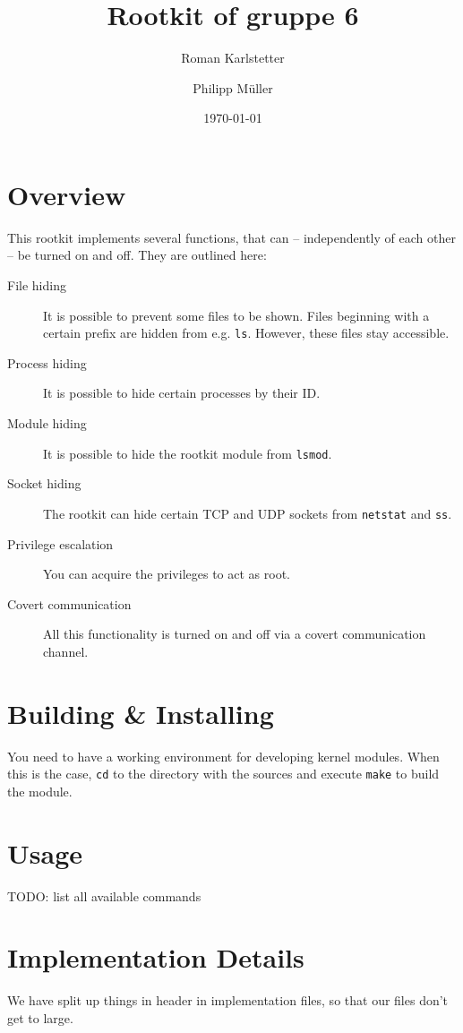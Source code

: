 \documentclass[10pt, letterpaper]{article}
\title{Rootkit of gruppe 6}
\author{Roman Karlstetter \and Philipp M\"uller}
\date{\today}
\begin{document}
\maketitle

\section{Overview}

This rootkit implements several functions, that can -- independently of each other -- be turned on and off. They are outlined here:

\begin{description}
\item [File hiding] It is possible to prevent some files to be shown. Files beginning with a certain prefix are hidden from e.g. \texttt{ls}. However, these files stay accessible.
\item [Process hiding] It is possible to hide certain processes by their ID.
\item [Module hiding] It is possible to hide the rootkit module from \texttt{lsmod}.
\item [Socket hiding] The rootkit can hide certain TCP and UDP sockets from \texttt{netstat} and \texttt{ss}.
\item [Privilege escalation] You can acquire the privileges to act as root.
\item [Covert communication] All this functionality is turned on and off via a covert communication channel.
\end{description}

\section{Building \& Installing}
You need to have a working environment for developing kernel modules. When this is the case, \texttt{cd} to the directory with the sources and execute \texttt{make} to build the module. 

\section{Usage}
TODO: list all available commands

\section{Implementation Details}
We have split up things in header in implementation files, so
that our files don't get to large.
\end{document}

